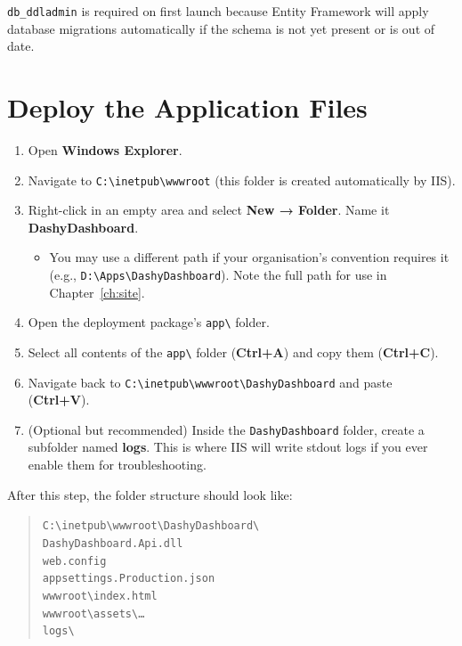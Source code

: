 \documentclass[12pt,a4paper]{report}
\begin{document}
\begin{notebox}
\texttt{db\_ddladmin} is required on first launch because Entity Framework will apply database migrations automatically if the schema is not yet present or is out of date.
\end{notebox}

\chapter{Deploy the Application Files}

\begin{enumerate}
  \item Open \textbf{Windows Explorer}.

  \item Navigate to \texttt{C:\textbackslash inetpub\textbackslash wwwroot} (this folder is created automatically by IIS).

  \item Right-click in an empty area and select \textbf{New → Folder}. Name it \textbf{DashyDashboard}.
  \begin{itemize}
    \item You may use a different path if your organisation's convention requires it (e.g., \texttt{D:\textbackslash Apps\textbackslash DashyDashboard}). Note the full path for use in Chapter~\ref{ch:site}.
  \end{itemize}

  \item Open the deployment package's \texttt{app\textbackslash} folder.

  \item Select all contents of the \texttt{app\textbackslash} folder (\textbf{Ctrl+A}) and copy them (\textbf{Ctrl+C}).

  \item Navigate back to \texttt{C:\textbackslash inetpub\textbackslash wwwroot\textbackslash DashyDashboard} and paste (\textbf{Ctrl+V}).

  \item (Optional but recommended) Inside the \texttt{DashyDashboard} folder, create a subfolder named \textbf{logs}. This is where IIS will write stdout logs if you ever enable them for troubleshooting.
\end{enumerate}

After this step, the folder structure should look like:
\begin{quote}
  \texttt{C:\textbackslash inetpub\textbackslash wwwroot\textbackslash DashyDashboard\textbackslash}\\
  \quad \texttt{DashyDashboard.Api.dll}\\
  \quad \texttt{web.config}\\
  \quad \texttt{appsettings.Production.json}\\
  \quad \texttt{wwwroot\textbackslash index.html}\\
  \quad \texttt{wwwroot\textbackslash assets\textbackslash \ldots}\\
  \quad \texttt{logs\textbackslash}
\end{quote}
\end{document}
